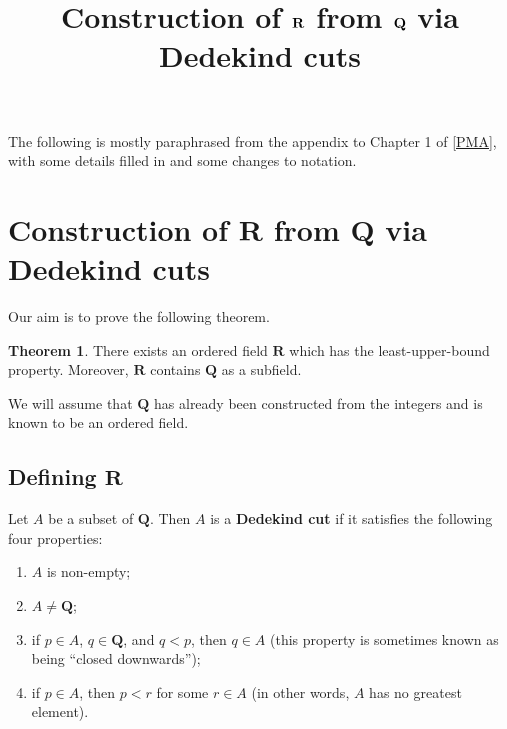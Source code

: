 \documentclass[12pt]{article}
\title{Construction of \texorpdfstring{\(\R\)}{} from \texorpdfstring{\(\Q\)}{} via Dedekind cuts}
\author{}
\date{\vspace{-24mm}}
\newcommand{\Q}{\mathbf{Q}}
\newcommand{\R}{\mathbf{R}}
\theoremstyle{definition}
\newtheorem{theorem}{Theorem}
\begin{document}
\maketitle

\tableofcontents

\newpage

The following is mostly paraphrased from the appendix to Chapter 1 of \hyperlink{pma}{[PMA]}, with some details filled in and some changes to notation.

\section{Construction of \texorpdfstring{\(\R\)}{} from \texorpdfstring{\(\Q\)}{} via Dedekind cuts}

Our aim is to prove the following theorem.

\begin{theorem}
\label{thm:real_number_field}
    There exists an ordered field \( \R \) which has the least-upper-bound property. Moreover, \( \R \) contains \( \Q \) as a subfield.
\end{theorem}

We will assume that \( \Q \) has already been constructed from the integers and is known to be an ordered field.

\subsection{Defining \texorpdfstring{\(\R\)}{}}
\label{sec:defining_R}

Let \( A \) be a subset of \( \Q \). Then \( A \) is a \textbf{Dedekind cut} if it satisfies the following four properties:

\begin{enumerate}[label = (\Roman*)]
    \item \( A \) is non-empty;
    
    \item \( A \neq \Q \);
    
    \item if \( p \in A \), \( q \in \Q \), and \( q < p \), then \( q \in A \) (this property is sometimes known as being ``closed downwards'');
    
    \item if \( p \in A \), then \( p < r \) for some \( r \in A \) (in other words, \( A \) has no greatest element).
\end{enumerate}
\end{document}
